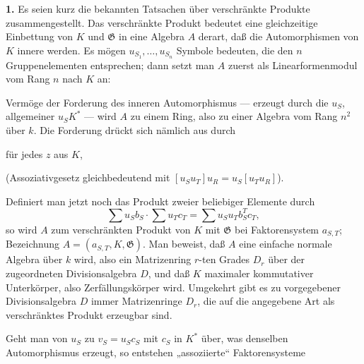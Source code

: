 \noindent\textbf{1.} Es seien kurz die bekannten Tatsachen über verschränkte Produkte zusammengestellt. Das verschränkte Produkt bedeutet eine gleichzeitige Einbettung von \(K\) und \(\mathfrak G\) in eine Algebra \(A\) derart, daß die Automorphismen von \(K\) innere werden. Es mögen \(u_{S_1},\ldots,u_{S_n}\) Symbole bedeuten, die den \(n\) Gruppenelementen entsprechen; dann setzt man \(A\) zuerst als Linearformenmodul vom Rang \(n\) nach \(K\) an:


Vermöge der Forderung des inneren Automorphismus --- erzeugt durch die \(u_S\), allgemeiner \(u_SK^*\) --- wird \(A\) zu einem Ring, also zu einer Algebra vom Rang \(n^2\) über \(k\). Die Forderung drückt sich nämlich aus durch


für jedes \(z\) aus \(K\),



(Assoziativgesetz gleichbedeutend mit \([u_Su_T]u_R=u_S[u_Tu_R]\)).

Definiert man jetzt noch das Produkt zweier beliebiger Elemente durch
\[
\sum u_Sb_S\cdot\sum u_Tc_T=\sum u_Su_Tb_S^Tc_T,
\]
so wird \(A\) zum verschränkten Produkt von \(K\) mit \(\mathfrak G\) bei Faktorensystem \(a_{S,T}\); Bezeichnung \(A=(a_{S,T},K,\mathfrak G)\). Man beweist, daß \(A\) eine einfache normale Algebra über \(k\) wird, also ein Matrizenring \(r\)-ten Grades \(D_r\) über der zugeordneten Divisionsalgebra \(D\), und daß \(K\) maximaler kommutativer Unterkörper, also Zerfällungskörper wird. Umgekehrt gibt es zu vorgegebener Divisionsalgebra \(D\) immer Matrizenringe \(D_r\), die auf die angegebene Art als verschränktes Produkt erzeugbar sind.

Geht man von \(u_S\) zu \(v_S=u_Sc_S\) mit \(c_S\) in \(K^*\) über, was denselben Automorphismus erzeugt, so entstehen „assoziierte“ Faktorensysteme

